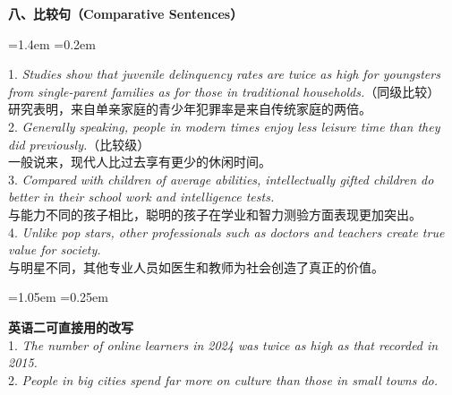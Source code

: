 \documentclass[11pt,a4paper]{ctexart}
\newcommand{\en}[1]{\textit{#1}}
\newenvironment{note}{%
  \par\addvspace{5pt}%
  \begin{list}{}{\leftmargin=1.05em \rightmargin=0.25em \listparindent=0pt
    \itemindent=0pt \topsep=0pt \parsep=2pt \itemsep=2pt \partopsep=0pt}%
  \item\relax\small\color{ink}%
}{%
  \end{list}\addvspace{5pt}%
}
\newenvironment{eg}{%
  \par\addvspace{4pt}%
  \begin{list}{}{\leftmargin=1.4em \rightmargin=0.2em \listparindent=0pt
    \itemindent=0pt \topsep=0pt \parsep=2pt \itemsep=2pt \partopsep=0pt}%
  \item\relax
}{%
  \end{list}\addvspace{5pt}%
}
\begin{document}
\par\addvspace{6pt}\noindent\textbf{八、比较句（Comparative Sentences）}\par\addvspace{2pt}
\begin{eg}
1. \en{Studies show that juvenile delinquency rates are twice as high for youngsters from single-parent families as for those in traditional households.}（同级比较）\\
研究表明，来自单亲家庭的青少年犯罪率是来自传统家庭的两倍。\\
2. \en{Generally speaking, people in modern times enjoy less leisure time than they did previously.}（比较级）\\
一般说来，现代人比过去享有更少的休闲时间。\\
3. \en{Compared with children of average abilities, intellectually gifted children do better in their school work and intelligence tests.}\\
与能力不同的孩子相比，聪明的孩子在学业和智力测验方面表现更加突出。\\
4. \en{Unlike pop stars, other professionals such as doctors and teachers create true value for society.}\\
与明星不同，其他专业人员如医生和教师为社会创造了真正的价值。\\
\end{eg}
\begin{note}
\textbf{英语二可直接用的改写}\\
1. \en{The number of online learners in 2024 was twice as high as that recorded in 2015.}\\
2. \en{People in big cities spend far more on culture than those in small towns do.}
\end{note}
\end{document}
